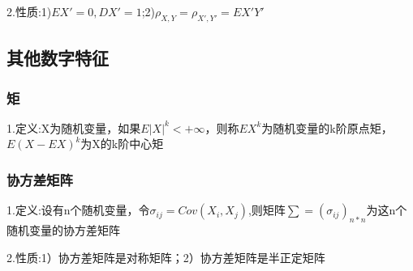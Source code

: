 \documentclass[11pt,twoside,a4paper]{ctexart}
\begin{document}
    2.性质:1)$EX' = 0,DX' = 1$;2)$\rho _{X,Y} = \rho _{X',Y'} = EX'Y'$

    \subsection{其他数字特征}

    \subsubsection{矩}
    1.定义:X为随机变量，如果$E|X|^k < +\infty $，则称$EX^k$为随机变量的k阶原点矩，$E(X - EX)^k$为X的k阶中心矩

    \subsubsection{协方差矩阵}
    1.定义:设有n个随机变量，令$\sigma _{ij} = Cov(X_i,X_j)$,则矩阵$\sum = (\sigma _{ij})_{n*n}$为这n个随机变量的协方差矩阵

    2.性质:1）协方差矩阵是对称矩阵；2）协方差矩阵是半正定矩阵
\end{document}
